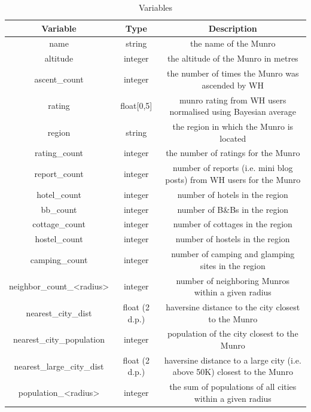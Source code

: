 \documentclass[11pt,a4paper]{article}
\begin{document}
\begin{table}
    \centering
     \begin{tabular}{||c | c | c||} 
     \hline
     Variable & Type & Description  \\ 
     \hline\hline
     name & string & the name of the Munro \\ 
     \hline
     altitude & integer & the altitude of the Munro in metres \\
     \hline
     ascent\_count & integer & the number of times the Munro was ascended by WH \\
     \hline
     rating & float[0,5] & munro rating from WH users normalised using Bayesian average \\
     \hline
     region & string & the region in which the Munro is located \\
     \hline 
     rating\_count & integer & the number of ratings for the Munro \\
     \hline 
     report\_count & integer & number of reports (i.e. mini blog posts) from WH users for the Munro \\
     \hline 
     hotel\_count & integer & number of hotels in the region \\
     \hline 
     bb\_count & integer & number of B\&Bs in the region \\
     \hline 
     cottage\_count & integer & number of cottages in the region \\
     \hline
     hostel\_count & integer & number of hostels in the region \\
     \hline
     camping\_count & integer & number of camping and glamping sites in the region \\
     \hline
     neighbor\_count\_<radius> & integer & number of neighboring Munros within a given radius \\
     \hline 
     nearest\_city\_dist & float (2 d.p.) & haversine distance to the city closest to the Munro \\
     \hline
     nearest\_city\_population & integer & population of the city closest to the Munro \\
     \hline 
     nearest\_large\_city\_dist & float (2 d.p.) & haversine distance to a large city (i.e. above 50K) closest to the Munro \\
     \hline 
     population\_<radius> & integer & the sum of populations of all cities within a given radius \\
     \hline
    \end{tabular}
    \caption{Variables}
    \label{table:1}
\end{table}
\end{document}
